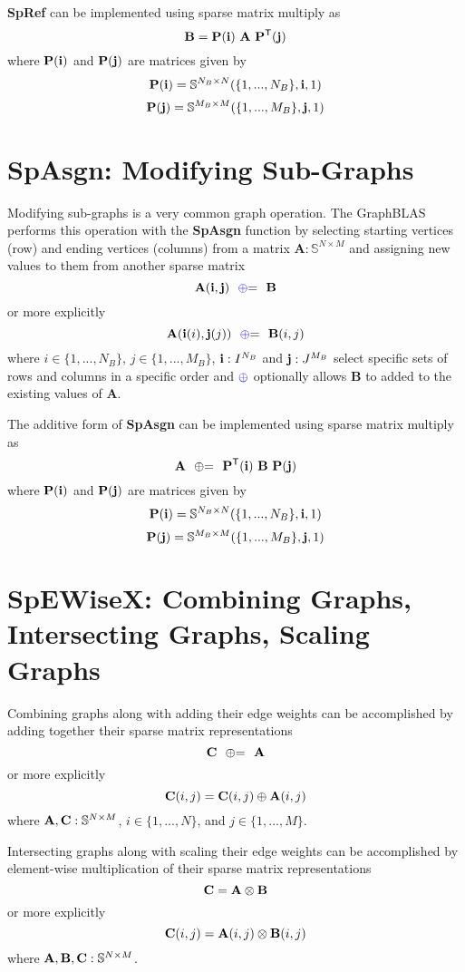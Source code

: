   {\bf SpRef} can be implemented using sparse matrix multiply as
$$
   \mathbf{B}= \mathbf{P}({\bf i}) ~ \mathbf{A} ~ \mathbf{P}^{\sf T}({\bf j})
$$
where $\mathbf{P}({\bf i})$ and $\mathbf{P}({\bf j})$ are matrices given by
$$
   \mathbf{P}({\bf i}) = \mathbb{S}^{N_B \times N}(\{1,...,N_B\},{\bf i},1)
$$
$$
    \mathbf{P}({\bf j}) = \mathbb{S}^{M_B \times M}(\{1,...,M_B\},{\bf j},1)
$$


\section{SpAsgn: Modifying Sub-Graphs}
  Modifying sub-graphs is a very common graph operation.  The GraphBLAS performs this operation with the {\bf SpAsgn} function by selecting starting vertices (row) and ending vertices (columns) from a matrix $\mathbf{A} : \mathbb{S}^{N \times M}$ and assigning new values to them from another sparse matrix
$$
   \mathbf{A}({\bf i},{\bf j}) ~~ {\textcolor{blue}{\oplus}}{=} ~~ \mathbf{B}
$$
or more explicitly
$$
   {\bf A}({\bf i}(i),{\bf j}(j)) ~~ {\textcolor{blue}{\oplus}}{=} ~~{\bf B}(i,j) 
$$
where $i \in \{1,...,N_B\}$, $j \in \{1,...,M_B\}$, ${\bf i} : I^{N_B}$ and ${\bf j}: J^{M_B}$ select specific sets of rows and columns in a specific order and ${\textcolor{blue}{\oplus}}$ optionally allows $\mathbf{B}$ to added to the existing values of $\mathbf{A}$. 

  The additive form of {\bf SpAsgn} can be implemented using sparse matrix multiply as
$$
   \mathbf{A} ~~ {\oplus}{=} ~~ \mathbf{P}^{\sf T}({\bf i}) ~ \mathbf{B} ~ \mathbf{P}({\bf j})
$$
where $\mathbf{P}({\bf i})$ and $\mathbf{P}({\bf j})$ are matrices given by
$$
   \mathbf{P}({\bf i}) = \mathbb{S}^{N_B \times N}(\{1,...,N_B\},{\bf i},1)
$$
$$
    \mathbf{P}({\bf j}) = \mathbb{S}^{M_B \times M}(\{1,...,M_B\},{\bf j},1)
$$
  

\section{SpEWiseX: Combining Graphs, Intersecting Graphs, Scaling Graphs}
  Combining graphs along with adding their edge weights can be accomplished by adding together their sparse matrix representations
$$
   {\bf C} ~~ {\oplus}{=} ~~ {\bf A}
$$
or more explicitly
$$
   {\bf C}(i,j) = {\bf C}(i,j) \oplus {\bf A}(i,j)
$$
where ${\bf A},{\bf C}: \mathbb{S}^{N \times M}$, $i \in \{1,...,N\}$, and $j \in \{1,...,M\}$.

  Intersecting graphs along with scaling their edge weights can be accomplished by element-wise multiplication of their sparse matrix representations
$$
   {\bf C} = {\bf A} \otimes {\bf B}
$$
or more explicitly
$$
   {\bf C}(i,j) = {\bf A}(i,j) \otimes {\bf B}(i,j)
$$
where ${\bf A},{\bf B},{\bf C}: \mathbb{S}^{N \times M}$.


